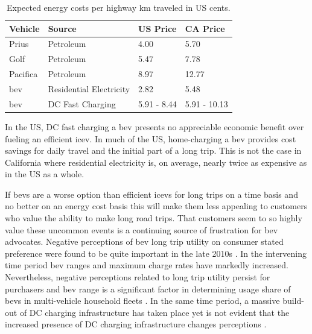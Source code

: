 \documentclass[11pt]{article}
\begin{document}
\begin{multicols}{2}
\begin{table}[H]
	\centering
	\caption{Expected energy costs per highway km traveled in US cents.}
	\label{tab:expected_energy_costs_per_km}
	\begin{tabular}{|C{\linewidth / 4}|C{\linewidth / 4}|C{\linewidth / 4}|C{\linewidth / 4}|}
		\hline Vehicle & Source & US Price & CA Price \\
		\hline Prius & Petroleum & 4.00 & 5.70 \\
		\hline Golf & Petroleum & 5.47 & 7.78 \\
		\hline Pacifica & Petroleum & 8.97 & 12.77 \\
		\hline \gls{bev} & Residential Electricity & 2.82 & 5.48 \\
		\hline \gls{bev} & DC Fast Charging & 5.91 - 8.44 & 5.91 - 10.13 \\
		\hline
	\end{tabular}
\end{table}

In the US, DC fast charging a \gls{bev} presents no appreciable economic benefit over fueling an efficient \gls{icev}. In much of the US, home-charging a \gls{bev} provides cost savings for daily travel and the initial part of a long trip. This is not the case in California where residential electricity is, on average, nearly twice as expensive as in the US as a whole.

If \glspl{bev} are a worse option than efficient \glspl{icev} for long trips on a time basis and no better on an energy cost basis this will make them less appealing to customers who value the ability to make long road trips. That customers seem to so highly value these uncommon events is a continuing source of frustration for \gls{bev} advocates. Negative perceptions of \gls{bev} long trip utility on consumer stated preference were found to be quite important in the late 2010s \cite{Skippon_2016, Hardman_2016, Franke_2017, Schmalfuss_2017}. In the intervening time period \gls{bev} ranges and maximum charge rates have markedly increased. Nevertheless, negative perceptions related to long trip utility persist for purchasers \cite{Bhat_2022, Paradies_2023, Corradi_2023, Philip_2023} and \gls{bev} range is a significant factor in determining usage share of \glspl{bev} in multi-vehicle household fleets \cite{Chakraborty_2022}. In the same time period, a massive build-out of DC charging infrastructure has taken place yet is not evident that the increased presence of DC charging infrastructure changes perceptions \cite{Hoogland_2023}.


\end{multicols}
\end{document}
